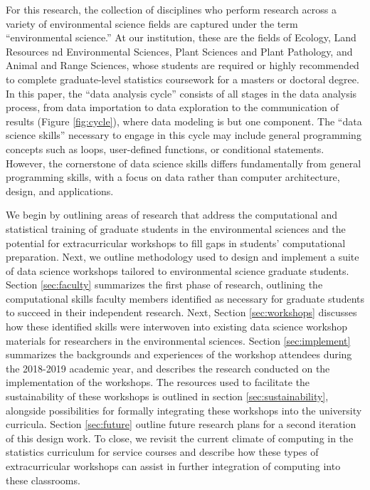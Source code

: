 \documentclass[12pt]{article}
\begin{document}
\quad For this research, the collection of disciplines who perform research 
across a variety of environmental science fields are captured under the term 
``environmental science.'' At our institution, these are the fields of Ecology, 
Land Resources nd Environmental Sciences, Plant Sciences and Plant Pathology,
and Animal and Range Sciences, whose students are required or highly recommended
to complete graduate-level statistics coursework for a masters or doctoral
degree. In this paper, the ``data analysis cycle'' consists of all stages in the
data analysis process, from data importation to data exploration to the
communication of results (Figure \ref{fig:cycle}), where data modeling is but
one component. The ``data science skills'' necessary to engage in this cycle may
include general programming concepts such as loops, user-defined functions, or 
conditional statements. However, the cornerstone of data science skills differs
fundamentally from general programming skills, with a focus on data rather than 
computer architecture, design, and applications. 

\quad We begin by outlining areas of research that address the computational and
statistical training of graduate students in the environmental sciences and the 
potential for extracurricular workshops to fill gaps in students' computational 
preparation. Next, we outline methodology used to design and implement a suite
of data science workshops tailored to environmental science graduate students. 
Section \ref{sec:faculty} summarizes the first phase of research, outlining the
computational skills faculty members identified as necessary for graduate
students to succeed in their independent research. Next, Section 
\ref{sec:workshops} discusses how these identified skills were interwoven into
existing data science workshop materials for researchers in the environmental
sciences. Section \ref{sec:implement} summarizes the backgrounds and experiences
of the workshop attendees during the 2018-2019 academic year, and describes the
research conducted on the implementation of the workshops. The resources used to 
facilitate the sustainability of these workshops is outlined in section 
\ref{sec:sustainability}, alongside possibilities for formally integrating these
workshops into the university curricula. Section \ref{sec:future} outline
future research plans for a second iteration of this design work. To close, we
revisit the current climate of computing in the statistics curriculum for
service courses and describe how these types of extracurricular workshops can
assist in further integration of computing into these classrooms. 
\end{document}

